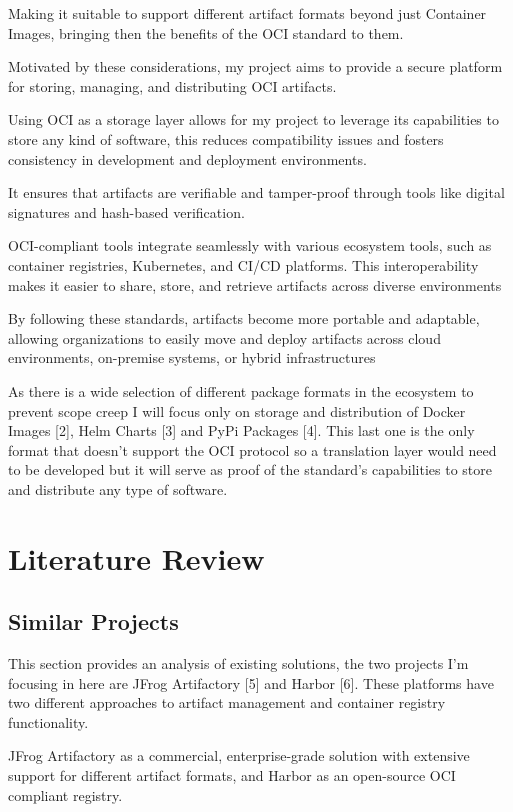 \documentclass{article}
\begin{document}
  Making it suitable to support different artifact formats beyond just Container Images, bringing then the benefits of the OCI standard to them.

  Motivated by these considerations, my project aims to provide a secure platform for storing, managing, and distributing OCI artifacts.

  Using OCI as a storage layer allows for my project to leverage its capabilities to store any kind of software, this reduces compatibility issues and fosters consistency in development and deployment environments. 

  It ensures that artifacts are verifiable and tamper-proof through tools like digital signatures and hash-based verification.

  OCI-compliant tools integrate seamlessly with various ecosystem tools, such as container registries, Kubernetes, and CI/CD platforms. This interoperability makes it easier to share, store, and retrieve artifacts across diverse environments

  By following these standards, artifacts become more portable and adaptable, allowing organizations to easily move and deploy artifacts across cloud environments, on-premise systems, or hybrid infrastructures

  As there is a wide selection of different package formats in the ecosystem to prevent scope creep I will focus only on storage and distribution of Docker Images [2], Helm Charts [3] and PyPi Packages [4]. This last one is the only format that doesn't support the OCI protocol so a translation layer would need to be developed but it will serve as proof of the standard's capabilities to store and distribute any type of software.

  \section{Literature Review}

  \subsection{Similar Projects}

  This section provides an analysis of existing solutions, the two projects I'm focusing in here are JFrog Artifactory [5] and Harbor [6]. These platforms have two different approaches to artifact management and container registry functionality.
  
  JFrog Artifactory as a commercial, enterprise-grade solution with extensive support for different artifact formats, and Harbor as an open-source OCI compliant registry.
\end{document}
